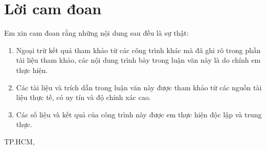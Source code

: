 \chapter*{Lời cam đoan}
Em xin cam đoan rằng những nội dung sau đều là sự thật:

\begin{enumerate}
    \item Ngoại trừ kết quả tham khảo từ các công trình khác mà đã ghi rõ trong phần tài liệu tham khảo, các nội dung trình bày trong luận văn này là do chính em thực hiện.

    \item Các tài liệu và trích dẫn trong luận văn này được tham khảo từ các nguồn tài liệu thực tế, có uy tín và độ chính xác cao.

    \item Các số liệu và kết quả của công trình này được em thực hiện độc lập và trung thực.
\end{enumerate}

\bigskip
\bigskip

\begin{flushright}
TP.HCM, \csCompileTime

\bigskip
\bigskip
\bigskip
\bigskip

\csSVone
\end{flushright}
